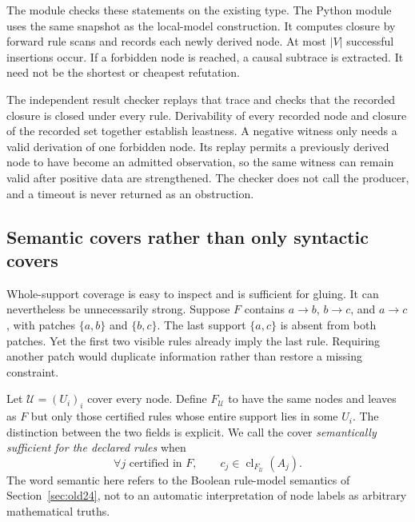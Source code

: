 The module  checks these statements on the existing  type. The Python module  uses the same  snapshot as the local-model construction. It computes closure by forward rule scans and records each newly derived node. At most $|V|$ successful insertions occur. If a forbidden node is reached, a causal subtrace is extracted. It need not be the shortest or cheapest refutation.

The independent result checker replays that trace and checks that the recorded closure is closed under every rule. Derivability of every recorded node and closure of the recorded set together establish leastness. A negative witness only needs a valid derivation of one forbidden node. Its replay permits a previously derived node to have become an admitted observation, so the same witness can remain valid after positive data are strengthened. The checker does not call the producer, and a timeout is never returned as an obstruction.

\subsection{Semantic covers rather than only syntactic covers}
\label{sec:semantic-cover}

Whole-support coverage is easy to inspect and is sufficient for gluing. It can nevertheless be unnecessarily strong. Suppose $F$ contains $a\to b$, $b\to c$, and $a\to c$, with patches $\{a,b\}$ and $\{b,c\}$. The last support $\{a,c\}$ is absent from both patches. Yet the first two visible rules already imply the last rule. Requiring another patch would duplicate information rather than restore a missing constraint.

Let $\mathcal U=(U_i)_i$ cover every node. Define $F_{\mathcal U}$ to have the same nodes and leaves as $F$ but only those certified rules whose entire support lies in some $U_i$. The distinction between the two fields is explicit. We call the cover \emph{semantically sufficient for the declared rules} when
\[
 \forall j\text{ certified in }F,\qquad
 c_j\in\operatorname{cl}_{F_{\mathcal U}}(A_j).
 \tag{SC}\label{eq:semantic-cover}
\]
The word semantic here refers to the Boolean rule-model semantics of Section~\ref{sec:old24}, not to an automatic interpretation of node labels as arbitrary mathematical truths.

